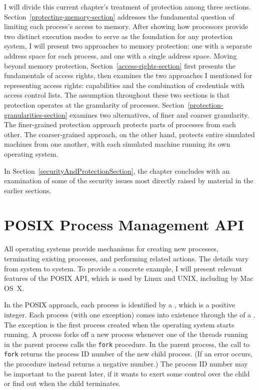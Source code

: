 I will divide this current chapter's treatment of protection among three
sections.  Section~\ref{protecting-memory-section} addresses the fundamental
question of limiting each process's access to memory.  After showing
how processors provide two distinct execution modes to serve as
the foundation for any protection system, I will present
two approaches to memory protection: one with a separate address space for each process,
and one with a single address space.  Moving beyond memory protection,
Section~\ref{access-rights-section} first presents the fundamentals of
access rights, then
examines the two approaches I mentioned for representing access rights:
capabilities and the combination of credentials with access
control lists.  The assumption throughout these two sections is
that protection operates at the granularity of processes.
Section~\ref{protection-granularities-section} examines two alternatives, of finer and coarser
granularity.  The finer-grained protection approach protects parts of
processes from each other.  The coarser-grained approach, on the other
hand, protects entire simulated machines from one another, with each
simulated machine running its own operating system.

In
Section~\ref{securityAndProtectionSection}, the chapter concludes  with an examination of some of the
security issues most directly raised by material in the earlier
sections.

\section{POSIX Process Management API}\label{process-api-section}

All operating systems provide mechanisms for creating new processes,
terminating existing processes, and performing related actions.  The
details vary from system to system.  To provide a concrete example, I
will present relevant features of the POSIX API, which is used by
Linux and UNIX, including by Mac OS~X.

In the POSIX approach, each process is identified by a
, which is a positive integer.  Each process (with one exception) comes into 
existence through the  of a
.  The exception is the first process
created when the operating system starts running.  A process forks off
a new process whenever one of the threads running in the parent
process calls the \verb|fork| procedure.  In the parent process, the
call to \verb|fork| returns the process ID number of the new child
process.  (If an error occurs, the
procedure instead returns a negative number.)  The process ID number
may be important to the parent later, if it wants to exert some
control over the child or find out when the child terminates.

